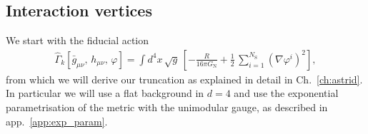 \documentclass[11pt]{book}
\newcommand\bgmunu{ \bar g_{\mu\nu} }
\newcommand\hmunu{ h_{\mu\nu} }
\newcommand\NS{ N_{\scriptscriptstyle{\mathrm{S}}} }
\newcommand\GNewton{ G_{\scriptscriptstyle{\mathrm{N}}}{} }
\numberwithin{equation}{chapter}
\begin{document}
\begin{appendices}
\section{Interaction vertices}

We start with the fiducial action
\begin{align}
  \hat \Gamma_k[\bgmunu, \, \hmunu, \, \varphi] = \int d^4x \, \sqrt{g} \,
  \left[
    - \frac{R}{16 \pi \GNewton} + \frac{1}{2} \, \sum_{i=1}^{\NS} \left( \nabla\varphi^i \right)^2
  \right] ,
\end{align}
from which we will derive our truncation as explained in detail in Ch.~\ref{ch:astrid}.
In particular we will use a flat background in $d=4$ and use the
exponential parametrisation of the metric with the unimodular gauge, as
described in app.~\ref{app:exp_param}.


\end{appendices}
\end{document}
